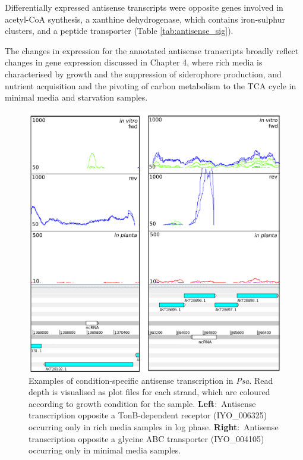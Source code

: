 Differentially expressed antisense transcripts were opposite genes involved in acetyl-CoA synthesis, a xanthine dehydrogenase, which contains iron-sulphur clusters, and a peptide transporter (Table \ref{tab:antisense_sig}).

The changes in expression for the annotated antisense transcripts broadly reflect changes in gene expression discussed in Chapter 4, where rich media is characterised by growth and the suppression of siderophore production, and nutrient acquisition and the pivoting of carbon metabolism to the TCA cycle in minimal media and starvation samples.

\begin{figure}[H]
    \centering
    \includegraphics[scale=1.4]{psa/psa_ncRNA/antisense_condition_specific.png}
    \caption[Examples of condition-specific antisense transcription in \textit{Psa}]{Examples of condition-specific antisense transcription in \textit{Psa}. Read depth is visualised as plot files for each strand, which are coloured according to growth condition for the sample. \textbf{Left}$:$ Antisense transcription opposite a TonB-dependent receptor (IYO\_006325) occurring only in rich media samples in log phase. \textbf{Right}$:$ Antisense transcription opposite a glycine ABC transporter (IYO\_004105) occurring only in minimal media samples.}
    \label{fig:antisense_specific}
\end{figure}
